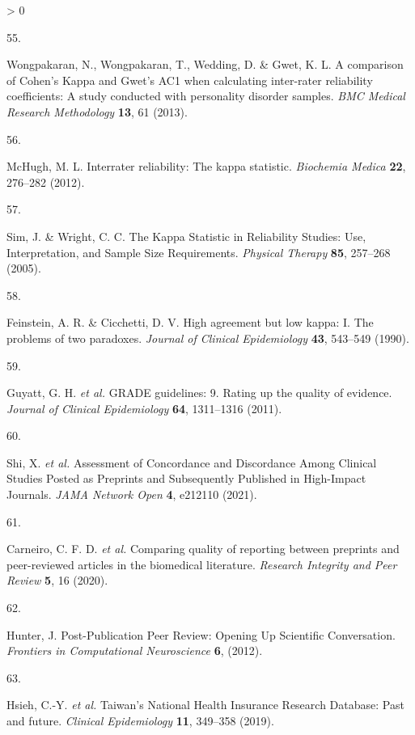 \documentclass[a4paper, twoside]{templates/ociamthesis}
\newlength{\cslhangindent}
\newlength{\csllabelwidth}
\newenvironment{CSLReferences}[3] %
 {%
  \setlength{\parindent}{0pt}
  \ifodd #1 \everypar{\setlength{\hangindent}{\cslhangindent}}\ignorespaces\fi
  \ifnum #2 > 0
  \setlength{\parskip}{#2\baselineskip}
  \fi
 }%
 {}
\newcommand{\CSLLeftMargin}[1]{\parbox[t]{\maxof{\widthof{#1}}{\csllabelwidth}}{#1}}
\newcommand{\CSLRightInline}[1]{\parbox[t]{\linewidth - \csllabelwidth}{#1}}
\begin{document}
\begin{CSLReferences}{0}{0}
\leavevmode\hypertarget{ref-wongpakaran2013}{}%
\CSLLeftMargin{55. }
\CSLRightInline{Wongpakaran, N., Wongpakaran, T., Wedding, D. \& Gwet, K. L. A comparison of {Cohen}'s {Kappa} and {Gwet}'s {AC1} when calculating inter-rater reliability coefficients: A study conducted with personality disorder samples. \emph{BMC Medical Research Methodology} \textbf{13}, 61 (2013).}

\leavevmode\hypertarget{ref-mchugh2012}{}%
\CSLLeftMargin{56. }
\CSLRightInline{McHugh, M. L. Interrater reliability: The kappa statistic. \emph{Biochemia Medica} \textbf{22}, 276--282 (2012).}

\leavevmode\hypertarget{ref-sim2005}{}%
\CSLLeftMargin{57. }
\CSLRightInline{Sim, J. \& Wright, C. C. The {Kappa Statistic} in {Reliability Studies}: {Use}, {Interpretation}, and {Sample Size Requirements}. \emph{Physical Therapy} \textbf{85}, 257--268 (2005).}

\leavevmode\hypertarget{ref-feinstein1990}{}%
\CSLLeftMargin{58. }
\CSLRightInline{Feinstein, A. R. \& Cicchetti, D. V. High agreement but low kappa: {I}. {The} problems of two paradoxes. \emph{Journal of Clinical Epidemiology} \textbf{43}, 543--549 (1990).}

\leavevmode\hypertarget{ref-guyatt2011}{}%
\CSLLeftMargin{59. }
\CSLRightInline{Guyatt, G. H. \emph{et al.} {GRADE} guidelines: 9. {Rating} up the quality of evidence. \emph{Journal of Clinical Epidemiology} \textbf{64}, 1311--1316 (2011).}

\leavevmode\hypertarget{ref-shi2021}{}%
\CSLLeftMargin{60. }
\CSLRightInline{Shi, X. \emph{et al.} Assessment of {Concordance} and {Discordance Among Clinical Studies Posted} as {Preprints} and {Subsequently Published} in {High}-{Impact Journals}. \emph{JAMA Network Open} \textbf{4}, e212110 (2021).}

\leavevmode\hypertarget{ref-carneiro2020}{}%
\CSLLeftMargin{61. }
\CSLRightInline{Carneiro, C. F. D. \emph{et al.} Comparing quality of reporting between preprints and peer-reviewed articles in the biomedical literature. \emph{Research Integrity and Peer Review} \textbf{5}, 16 (2020).}

\leavevmode\hypertarget{ref-hunter2012}{}%
\CSLLeftMargin{62. }
\CSLRightInline{Hunter, J. Post-{Publication Peer Review}: {Opening Up Scientific Conversation}. \emph{Frontiers in Computational Neuroscience} \textbf{6}, (2012).}

\leavevmode\hypertarget{ref-hsieh2019}{}%
\CSLLeftMargin{63. }
\CSLRightInline{Hsieh, C.-Y. \emph{et al.} Taiwan's {National Health Insurance Research Database}: Past and future. \emph{Clinical Epidemiology} \textbf{11}, 349--358 (2019).}


\end{CSLReferences}
\end{document}
